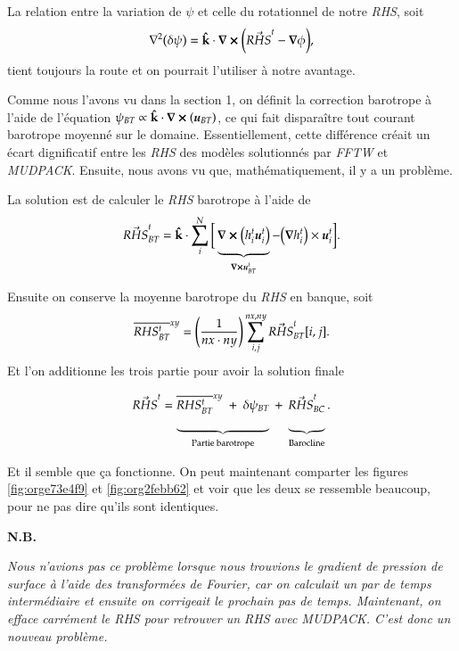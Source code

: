 \documentclass[10pt]{article}
\numberwithin{equation}{section}
\newcommand{\kvf}{\vb{\hat{k}}}
\newcommand{\uu}{\vb*{u}}
\newcommand{\grande}{\vphantom{\frac{1}{xx}}}
\newcommand{\venti}{\vphantom{\sum_x^x}}
\newcommand{\xymean}[1]{\overline{#1}^{xy}}
\newcommand{\nb}{\textbf{N.B.}\hspace{4pt}}
\begin{document}
La relation entre la variation de \(\psi\) et celle du rotationnel de notre \emph{RHS}, soit
\begin{equation}
   \laplacian(\delta \psi) = \kvf\cdot\curl(\vec{RHS}^t - \gradient{\phi}),
\end{equation}
tient toujours la route et on pourrait l'utiliser à notre avantage.\bigskip

Comme nous l'avons vu dans la section 1, on définit la correction barotrope à l'aide de l'équation \(\psi_{BT} \propto \kvf\cdot\curl(\uu_{BT})\), ce qui fait disparaître tout courant barotrope moyenné sur le domaine.
Essentiellement, cette différence créait un écart dignificatif entre les \emph{RHS} des modèles solutionnés par \emph{FFTW} et \emph{MUDPACK}.
Ensuite, nous avons vu que, mathématiquement, il y a un problème.\bigskip

La solution est de calculer le \emph{RHS} barotrope à l'aide de
\begin{equation}
   \vec{RHS}^t_{BT} = \kvf\cdot \sum_i^N \bigg[ \underbrace{\grande\curl(h^t_i \uu^t_i)}_{\curl{\uu^t_{BT}}}  - \qty(\gradient{h^t_i})\times\uu^t_i\bigg].
\end{equation}

Ensuite on conserve la moyenne barotrope du \emph{RHS} en banque, soit
\begin{equation}
   \xymean{RHS^t_{BT}} = \qty(\frac{1}{nx\cdot ny})\sum_{i,j}^{nx,ny} \vec{RHS}^t_{BT}[i,j].
\end{equation}
Et l'on additionne les trois partie pour avoir la solution finale
\begin{equation}
   \vec{RHS}^t = \underbrace{\venti\xymean{RHS^t_{BT}} \ + \ \delta \psi_{BT}}_\text{Partie barotrope}\ + \ \underbrace{\venti\vec{RHS}^t_{BC}}_\text{Barocline}.
\end{equation}

Et il semble que ça fonctionne.
On peut maintenant comparter les figures \ref{fig:orge73e4f9} et \ref{fig:org2febb62} et voir que les deux se ressemble beaucoup, pour ne pas dire qu'ils sont identiques. \bigskip

\nb\begin{minipage}[t]{0.9\linewidth}
\itshape Nous n'avions pas ce problème lorsque nous trouvions le gradient de pression de surface à l'aide des transformées de Fourier, car on calculait un par de temps intermédiaire et ensuite on corrigeait le prochain pas de temps. Maintenant, on efface carrément le RHS pour retrouver un RHS avec MUDPACK. C'est donc un nouveau problème.
\end{minipage}
\end{document}
